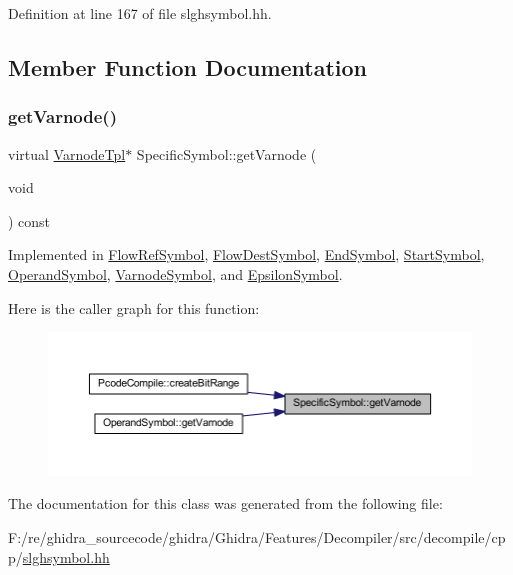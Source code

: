 Definition at line 167 of file slghsymbol.\+hh.



\subsection{Member Function Documentation}
\mbox{\label{class_specific_symbol_abbde46a1f6af6c373420773d45e1e4e2}} 
\subsubsection{\texorpdfstring{getVarnode()}{getVarnode()}}
{\footnotesize\ttfamily virtual \mbox{\hyperlink{class_varnode_tpl}{Varnode\+Tpl}}$\ast$ Specific\+Symbol\+::get\+Varnode (\begin{DoxyParamCaption}\item[{void}]{ }\end{DoxyParamCaption}) const\hspace{0.3cm}{\ttfamily [pure virtual]}}



Implemented in \mbox{\hyperlink{class_flow_ref_symbol_af5c2756a1ef4ef4a7bc454a328275d73}{Flow\+Ref\+Symbol}}, \mbox{\hyperlink{class_flow_dest_symbol_a458927a68a220edf0c8c2acf687ce906}{Flow\+Dest\+Symbol}}, \mbox{\hyperlink{class_end_symbol_a1d1cbb76194a73d62eed37ee0e182c8c}{End\+Symbol}}, \mbox{\hyperlink{class_start_symbol_a1f8a44a3f3f69018161563f7dc0a4d74}{Start\+Symbol}}, \mbox{\hyperlink{class_operand_symbol_a62fb73d10c92f1dd39977abe47f557d2}{Operand\+Symbol}}, \mbox{\hyperlink{class_varnode_symbol_aae6d99071fdc4ac8e55d78845898669f}{Varnode\+Symbol}}, and \mbox{\hyperlink{class_epsilon_symbol_aee856179a5dd1c4395acbeda85cb14b4}{Epsilon\+Symbol}}.

Here is the caller graph for this function\+:
\nopagebreak
\begin{figure}[H]
\begin{center}
\leavevmode
\includegraphics[width=350pt]{class_specific_symbol_abbde46a1f6af6c373420773d45e1e4e2_icgraph}
\end{center}
\end{figure}


The documentation for this class was generated from the following file\+:\begin{DoxyCompactItemize}
\item 
F\+:/re/ghidra\+\_\+sourcecode/ghidra/\+Ghidra/\+Features/\+Decompiler/src/decompile/cpp/\mbox{\hyperlink{slghsymbol_8hh}{slghsymbol.\+hh}}\end{DoxyCompactItemize}
